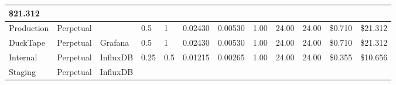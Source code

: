 \begin{landscape}
\begin{table}[!htbp]
\begin{tabular}{llllllllllll}
      \multicolumn{1}{l|}{\cellcolor[HTML]{F8696B}\$21.312} \\ \hline
    \multicolumn{1}{|l|}{\cellcolor[HTML]{EFC321}Production} &
      \multicolumn{1}{l|}{\cellcolor[HTML]{C6E0B4}Perpetual} &
      \multicolumn{1}{l|}{\cellcolor[HTML]{7030A0}{\color[HTML]{FFFFFF} BackendAPI}} &
      \multicolumn{1}{l|}{\cellcolor[HTML]{FFEB84}0.5} &
      \multicolumn{1}{l|}{\cellcolor[HTML]{FFEB84}1} &
      \multicolumn{1}{l|}{\cellcolor[HTML]{FFEB84}0.02430} &
      \multicolumn{1}{l|}{\cellcolor[HTML]{63BE7B}0.00530} &
      \multicolumn{1}{l|}{\cellcolor[HTML]{FFEB84}1.00} &
      \multicolumn{1}{l|}{\cellcolor[HTML]{F8696B}24.00} &
      \multicolumn{1}{l|}{\cellcolor[HTML]{F8696B}24.00} &
      \multicolumn{1}{l|}{\cellcolor[HTML]{F8696B}\$0.710} &
      \multicolumn{1}{l|}{\cellcolor[HTML]{F8696B}\$21.312} \\ \hline
    \multicolumn{1}{|l|}{\cellcolor[HTML]{FF5050}DuckTape} &
      \multicolumn{1}{l|}{\cellcolor[HTML]{C6E0B4}Perpetual} &
      \multicolumn{1}{l|}{\cellcolor[HTML]{F07F02}Grafana} &
      \multicolumn{1}{l|}{\cellcolor[HTML]{FFEB84}0.5} &
      \multicolumn{1}{l|}{\cellcolor[HTML]{FFEB84}1} &
      \multicolumn{1}{l|}{\cellcolor[HTML]{FFEB84}0.02430} &
      \multicolumn{1}{l|}{\cellcolor[HTML]{63BE7B}0.00530} &
      \multicolumn{1}{l|}{\cellcolor[HTML]{FFEB84}1.00} &
      \multicolumn{1}{l|}{\cellcolor[HTML]{F8696B}24.00} &
      \multicolumn{1}{l|}{\cellcolor[HTML]{F8696B}24.00} &
      \multicolumn{1}{l|}{\cellcolor[HTML]{F8696B}\$0.710} &
      \multicolumn{1}{l|}{\cellcolor[HTML]{F8696B}\$21.312} \\ \hline
    \multicolumn{1}{|l|}{\cellcolor[HTML]{92D050}Internal} &
      \multicolumn{1}{l|}{\cellcolor[HTML]{C6E0B4}Perpetual} &
      \multicolumn{1}{l|}{\cellcolor[HTML]{20A4EA}InfluxDB} &
      \multicolumn{1}{l|}{\cellcolor[HTML]{F8696B}0.25} &
      \multicolumn{1}{l|}{\cellcolor[HTML]{F8696B}0.5} &
      \multicolumn{1}{l|}{\cellcolor[HTML]{63BE7B}0.01215} &
      \multicolumn{1}{l|}{\cellcolor[HTML]{63BE7B}0.00265} &
      \multicolumn{1}{l|}{\cellcolor[HTML]{FFEB84}1.00} &
      \multicolumn{1}{l|}{\cellcolor[HTML]{F8696B}24.00} &
      \multicolumn{1}{l|}{\cellcolor[HTML]{F8696B}24.00} &
      \multicolumn{1}{l|}{\cellcolor[HTML]{FFEB84}\$0.355} &
      \multicolumn{1}{l|}{\cellcolor[HTML]{FFEB84}\$10.656} \\ \hline
    \multicolumn{1}{|l|}{\cellcolor[HTML]{FFFF00}Staging} &
      \multicolumn{1}{l|}{\cellcolor[HTML]{C6E0B4}Perpetual} &
      \multicolumn{1}{l|}{\cellcolor[HTML]{20A4EA}InfluxDB} &

\end{tabular}
\end{table}
\end{landscape}
